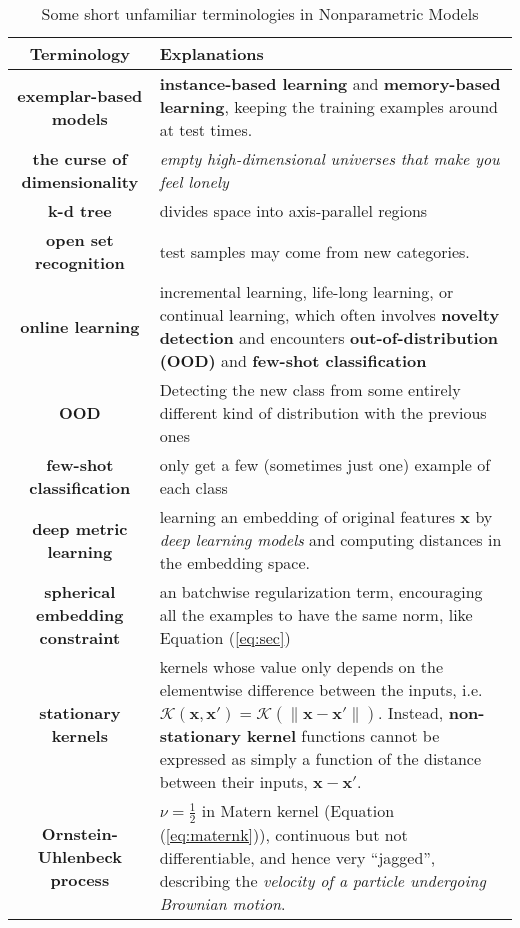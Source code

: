 \begin{table}[htpb]
    \centering
    \caption{Some short unfamiliar terminologies in Nonparametric Models}
    {\footnotesize

}
    {\small
    \begin{tabular}{cp{32em}}
        \toprule
        Terminology & Explanations \\
        \midrule
        \textbf{exemplar-based models} & \textbf{instance-based learning} and \textbf{memory-based learning}, keeping the training examples around at test times. \\
        \textbf{the curse of dimensionality} & \textit{empty high-dimensional universes that make you feel lonely} \\
        \textbf{k-d tree} & divides space into axis-parallel regions \\
        \textbf{open set recognition} & test samples may come from new categories. \\
        \textbf{online learning} & incremental learning, life-long learning, or continual learning, 
        which often involves \textbf{novelty detection} and encounters \textbf{out-of-distribution (OOD)} and \textbf{few-shot classification} \\
        \textbf{OOD} & Detecting the new class from some entirely different kind of distribution with the previous ones \\
        \textbf{few-shot classification} & only get a few (sometimes just one) example of each class \\
        \textbf{deep metric learning} & learning an embedding of original features $\bm{x}$ by \textit{deep learning models} and computing distances in the embedding space.\\
        \textbf{spherical embedding constraint} & an batchwise regularization term, encouraging all the examples to have the same norm, like Equation (\ref{eq:sec}) \\
        \textbf{stationary kernels} &  kernels whose value only depends on the elementwise difference between the inputs, i.e. $\mathcal{K}(\bm{x},\bm{x}')=\mathcal{K}(\|\bm{x}-\bm{x}'\|)$.
        Instead, \textbf{non-stationary kernel} functions cannot be expressed as simply a function of the distance between their inputs, $\bm{x}-\bm{x}'$.\\
        \textbf{Ornstein-Uhlenbeck process} & $\nu=\frac{1}{2}$ in Matern kernel (Equation (\ref{eq:maternk})), 
        continuous but not differentiable, and hence very ``jagged'', describing the \textit{velocity of a particle undergoing Brownian motion}. \\
        \bottomrule
    \end{tabular}}
    \label{tab:nonparam}
\end{table}




